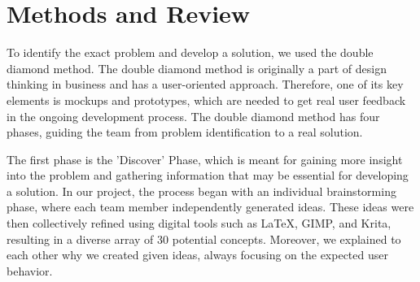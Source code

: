 \documentclass{article}
\begin{document}





\section{Methods and Review}
To identify the exact problem and develop a solution, we used the double diamond method.
The double diamond method is originally a part of design thinking in business and has a user-oriented approach.
Therefore, one of its key elements is mockups and prototypes,
which are needed to get real user feedback in the ongoing development process.
The double diamond method has four phases, guiding the team from problem identification to a real solution.

The first phase is the 'Discover' Phase,
which is meant for gaining more insight into the problem and gathering information that may be essential for developing a solution.
In our project, the process began with an individual brainstorming phase, where each team member independently generated ideas.
These ideas were then collectively refined using digital tools such as
LaTeX, GIMP, and Krita, resulting in a diverse array of 30 potential concepts.
Moreover, we explained to each other why we created given ideas, always focusing on the expected user behavior.
\end{document}
